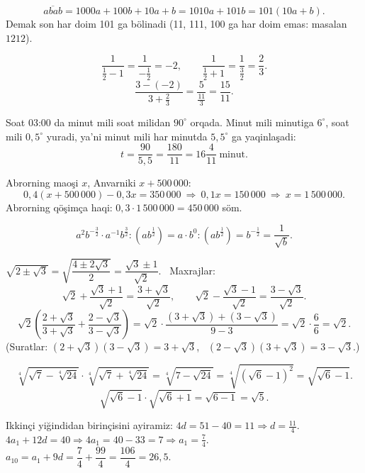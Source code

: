 




\[\overline{abab}=1000a+100b+10a+b=1010a+101b=101(10a+b).\]
Demak son har doim 101 ga bölinadi (11, 111, 100 ga har doim emas: masalan $1212$).

\[\frac1{\frac12-1}=\frac1{-\frac12}=-2,\qquad \frac1{\frac12+1}=\frac1{\frac32}=\frac23.\]
\[\frac{3-(-2)}{3+\frac23}=\frac5{\frac{11}3}=\frac{15}{11}.\]

Soat 03:00 da minut mili soat milidan $90^\circ$ orqada. Minut mili minutiga $6^\circ$, soat mili $0{,}5^\circ$ yuradi, ya'ni minut mili har minutda $5{,}5^\circ$ ga yaqinlaşadi:
\[t=\frac{90}{5{,}5}=\frac{180}{11}=16\frac4{11}\ \text{minut}.\]

Abrorning maoşi $x$, Anvarniki $x+500\,000$:
\[0{,}4(x+500\,000)-0{,}3x=350\,000\ \Rightarrow\ 0{,}1x=150\,000\ \Rightarrow\ x=1\,500\,000.\]
Abrorning qöşimça haqi: $0{,}3\cdot1\,500\,000=450\,000$ söm.

\[a^2b^{-\frac32}\cdot a^{-1}b^{\frac32}:\left(ab^{\frac12}\right)=a\cdot b^0:\left(ab^{\frac12}\right)=b^{-\frac12}=\frac1{\sqrt b}.\]

$\sqrt{2\pm\sqrt3}=\sqrt{\dfrac{4\pm2\sqrt3}2}=\dfrac{\sqrt3\pm1}{\sqrt2}$. \ Maxrajlar:
\[\sqrt2+\frac{\sqrt3+1}{\sqrt2}=\frac{3+\sqrt3}{\sqrt2},\qquad \sqrt2-\frac{\sqrt3-1}{\sqrt2}=\frac{3-\sqrt3}{\sqrt2}.\]
\[\sqrt2\left(\frac{2+\sqrt3}{3+\sqrt3}+\frac{2-\sqrt3}{3-\sqrt3}\right)=\sqrt2\cdot\frac{(3+\sqrt3)+(3-\sqrt3)}{9-3}=\sqrt2\cdot\frac66=\sqrt2.\]
(Suratlar: $(2+\sqrt3)(3-\sqrt3)=3+\sqrt3$, \ $(2-\sqrt3)(3+\sqrt3)=3-\sqrt3$.)

\[\sqrt[4]{\sqrt7-\sqrt[4]{24}}\cdot\sqrt[4]{\sqrt7+\sqrt[4]{24}}=\sqrt[4]{7-\sqrt{24}}=\sqrt[4]{\left(\sqrt6-1\right)^2}=\sqrt{\sqrt6-1}.\]
\[\sqrt{\sqrt6-1}\cdot\sqrt{\sqrt6+1}=\sqrt{6-1}=\sqrt5.\]

Ikkinçi yiğindidan birinçisini ayiramiz: $4d=51-40=11\Rightarrow d=\frac{11}4$.\\
$4a_1+12d=40\Rightarrow 4a_1=40-33=7\Rightarrow a_1=\frac74$. \quad $a_{10}=a_1+9d=\dfrac74+\dfrac{99}4=\dfrac{106}4=26{,}5$.

